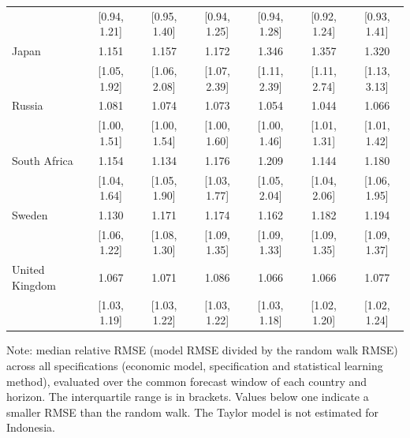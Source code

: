 \begin{table}[htbp]
{\begin{tabular*}{\textwidth}{@{\extracolsep{\fill}}lcccccc}
 & [0.94, 1.21] & [0.95, 1.40] & [0.94, 1.25] & [0.94, 1.28] & [0.92, 1.24] & [0.93, 1.41] \\
\addlinespace
Japan & 1.151 & 1.157 & 1.172 & 1.346 & 1.357 & 1.320 \\
 & [1.05, 1.92] & [1.06, 2.08] & [1.07, 2.39] & [1.11, 2.39] & [1.11, 2.74] & [1.13, 3.13] \\
\addlinespace
Russia & 1.081 & 1.074 & 1.073 & 1.054 & 1.044 & 1.066 \\
 & [1.00, 1.51] & [1.00, 1.54] & [1.00, 1.60] & [1.00, 1.46] & [1.01, 1.31] & [1.01, 1.42] \\
\addlinespace
South Africa & 1.154 & 1.134 & 1.176 & 1.209 & 1.144 & 1.180 \\
 & [1.04, 1.64] & [1.05, 1.90] & [1.03, 1.77] & [1.05, 2.04] & [1.04, 2.06] & [1.06, 1.95] \\
\addlinespace
Sweden & 1.130 & 1.171 & 1.174 & 1.162 & 1.182 & 1.194 \\
 & [1.06, 1.22] & [1.08, 1.30] & [1.09, 1.35] & [1.09, 1.33] & [1.09, 1.35] & [1.09, 1.37] \\
\addlinespace
United Kingdom & 1.067 & 1.071 & 1.086 & 1.066 & 1.066 & 1.077 \\
 & [1.03, 1.19] & [1.03, 1.22] & [1.03, 1.22] & [1.03, 1.18] & [1.02, 1.20] & [1.02, 1.24] \\
\bottomrule
\end{tabular*}
}
\par\noindent\begin{minipage}{\textwidth}
{\fontsize{8}{10}\selectfont Note: median relative RMSE (model RMSE divided by the random walk RMSE) across all specifications (economic model, specification and statistical learning method), evaluated over the common forecast window of each country and horizon. The interquartile range is in brackets. Values below one indicate a smaller RMSE than the random walk. The Taylor model is not estimated for Indonesia.}
\end{minipage}
\end{table}
